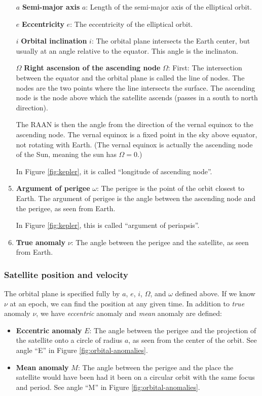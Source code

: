 \begin{enumerate}
    \item[$a$]
        \textbf{Semi-major axis} $a$: Length of the semi-major axis of the elliptical orbit.
    \item[$e$]
        \textbf{Eccentricity} $e$: The eccentricity of the elliptical orbit.
    \item[$i$]
        \textbf{Orbital inclination} $i$: The orbital plane intersects the Earth center, but usually at an angle relative to the equator. This angle is the inclinaton.
    \item[$\Omega$]
        \textbf{Right ascension of the ascending node} $\Omega$: First: The intersection between the equator and the orbital plane is called the line of nodes. The nodes are the two points where the line intersects the surface. The ascending node is the node above which the satellite ascends (passes in a south to north direction).

        The RAAN is then the angle from the direction of the vernal equinox to the ascending node. The vernal equinox is a fixed point in the sky above equator, not rotating with Earth. (The vernal equinox is actually the ascending node of the Sun, meaning the sun has $\Omega = 0$.)

        In Figure \ref{fig:kepler}, it is called ``longitude of ascending node''.
    \item
        \textbf{Argument of perigee} $\omega$: The perigee is the point of the orbit closest to Earth. The argument of perigee is the angle between the ascending node and the perigee, as seen from Earth.

        In Figure \ref{fig:kepler}, this is called ``argument of periapsis''.
    \item
        \textbf{True anomaly} $\nu$: The angle between the perigee and the satellite, as seen from Earth.
\end{enumerate}



\subsubsection{Satellite position and velocity}

The orbital plane is specified fully by $a$, $e$, $i$, $\Omega$, and $\omega$ defined above. If we know $\nu$ at an epoch, we can find the position at any given time. In addition to \emph{true} anomaly $\nu$, we have \emph{eccentric} anomaly and \emph{mean} anomaly are defined:
\begin{itemize}
    \item
        \textbf{Eccentric anomaly} $E$: The angle between the perigee and the projection of the satellite onto a circle of radius $a$, as seen from the center of the orbit. See angle ``E'' in Figure \ref{fig:orbital-anomalies}.
    \item
        \textbf{Mean anomaly} $M$: The angle between the perigee and the place the satellite would have been had it been on a circular orbit with the same focus and period. See angle ``M'' in Figure \ref{fig:orbital-anomalies}.
\end{itemize}

